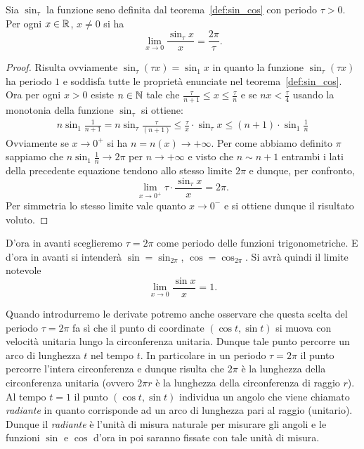 \begin{theorem}
  \label{th:limite_notevole_sin}%
Sia $\sin_\tau$ la funzione seno definita 
dal teorema~\ref{def:sin_cos} con periodo $\tau>0$.
Per ogni $x\in{\mathbb R}$, $x\neq 0$ si ha 
\[
\lim_{x\to 0}\frac{\sin_{\tau} x}{x}
= \frac{2\pi}{\tau}.
\]
\end{theorem}
%
\begin{proof}
Risulta ovviamente $\sin_\tau(\tau x) = \sin_1 x$ in quanto 
la funzione $\sin_\tau(\tau x)$ ha periodo $1$ e soddisfa tutte le proprietà 
enunciate nel teorema~\ref{def:sin_cos}.
Ora per ogni $x>0$ esiste $n\in {\mathbb N}$ tale che 
$\frac \tau {n+1} \le x \le \frac \tau n$ 
e se $nx<\frac \tau 4$ usando la monotonia della funzione $\sin_\tau$ 
si ottiene:
\begin{align*}
  n \sin_1 \frac 1 {n+1}
  = n \sin_\tau \frac \tau {(n+1)}
  \le \frac \tau x \cdot \sin_\tau x 
  \le (n+1)\cdot \sin_1 \frac 1 n
\end{align*}
Ovviamente se $x\to 0^+$ si ha $n=n(x)\to +\infty$.
Per come abbiamo definito $\pi$ 
sappiamo che $n \sin_1 \frac 1 n\to 2\pi$ per $n\to +\infty$
e visto che $n\sim n+1$ entrambi i lati della precedente equazione 
tendono allo stesso limite $2\pi$ e dunque, per confronto, 
\[
  \lim_{x\to 0^+} \tau \cdot \frac{\sin_\tau x}{x} = 2\pi.  
\]
Per simmetria lo stesso limite vale quanto $x\to 0^-$
e si ottiene dunque il risultato voluto.
\end{proof}

D'ora in avanti sceglieremo $\tau=2\pi$ come periodo 
delle funzioni trigonometriche.
E d'ora in avanti si intenderà $\sin = \sin_{2\pi}$, 
$\cos = \cos_{2\pi}$. Si avrà quindi il limite notevole 
\[
   \lim_{x\to 0} \frac{\sin x}{x} = 1.  
\]

Quando introdurremo le derivate potremo anche osservare che 
questa scelta del periodo $\tau=2\pi$ 
fa sì che il punto di coordinate
$(\cos t,\sin t)$ si muova con velocità unitaria lungo 
la circonferenza unitaria. 
Dunque tale punto percorre un arco di lunghezza $t$ nel tempo $t$.
In particolare in un periodo $\tau=2\pi$ il punto percorre l'intera 
circonferenza e dunque risulta che $2\pi$ è la lunghezza 
della circonferenza unitaria (ovvero $2\pi r$ è la lunghezza della circonferenza 
di raggio $r$).
Al tempo $t=1$ il punto $(\cos t,\sin t)$ individua un angolo che 
viene chiamato \emph{radiante} in quanto corrisponde ad un arco di lunghezza 
pari al raggio (unitario). 
Dunque il \emph{radiante} è l'unità di misura naturale per misurare gli angoli 
e le funzioni $\sin$ e $\cos$ d'ora in poi saranno fissate con tale unità di misura.

